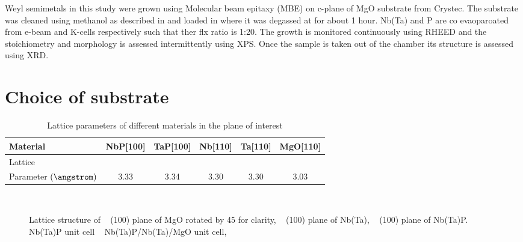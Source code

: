 \label{growth_of_wsm}

Weyl semimetals in this study were  grown using Molecular beam epitaxy (MBE) on c-plane 
of MgO substrate from Crystec. The substrate was cleaned using methanol
as described in  and loaded in \tamarind where it was degassed 
at  for about 1 hour. Nb(Ta) and P are co evaoparoated 
from e-beam and K-cells respectively such that ther flx ratio is 1:20. The growth is 
monitored continuously using RHEED and the stoichiometry and morphology is assessed 
intermittently using XPS. Once the sample is taken out of the chamber its structure is 
assessed using XRD.

\section{Choice of substrate}

\begin{table}
    \caption {
            Lattice parameters of different materials in the plane of interest
        }
    \centering
    \begin{tabular}{lccccc}
        \toprule
        Material & NbP[100] & TaP[100] & Nb[110] & Ta[110] & MgO[110]\\
        \midrule
        Lattice \\Parameter $\left(\angstrom\right)$ & 3.33 & 3.34 & 3.30 & 3.30 & 3.03\\
        \bottomrule
    \end{tabular}
\end{table}


\begin{figure}
   
    \centering
    \\
    \caption{
        Lattice structure of
        \sfA~ (100) plane of MgO rotated by 45 \degree for clarity, 
        \sfB~  (100) plane of Nb(Ta),  
        \sfC~  (100) plane of Nb(Ta)P.
        \sfD~ Nb(Ta)P unit cell
        \sfE~ Nb(Ta)P/Nb(Ta)/MgO unit cell,
    }
\end{figure}

